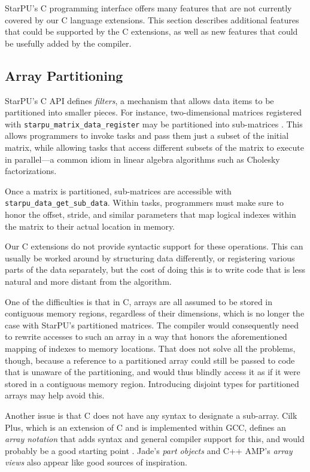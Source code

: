 \documentclass[twoside, a4paper, 10pt]{article}
\begin{document}
StarPU's C programming interface offers many features that are not
currently covered by our C language extensions.  This section describes
additional features that could be supported by the C extensions, as well
as new features that could be usefully added by the compiler.
\subsection{Array Partitioning}
\label{sec-5-1}


StarPU's C API defines \emph{filters}, a mechanism that allows data items to
be partitioned into smaller pieces.  For instance, two-dimensional
matrices registered with \texttt{starpu\_matrix\_data\_register} may be
partitioned into sub-matrices \cite{runtime12:starpu-handbook}.  This
allows programmers to invoke tasks and pass them just a subset of the
initial matrix, while allowing tasks that access different subsets of
the matrix to execute in parallel---a common idiom in linear algebra
algorithms such as Cholesky factorizations.

Once a matrix is partitioned, sub-matrices are accessible with
\texttt{starpu\_data\_get\_sub\_data}.  Within tasks, programmers must make sure to
honor the offset, stride, and similar parameters that map logical
indexes within the matrix to their actual location in memory.

Our C extensions do not provide syntactic support for these operations.
This can usually be worked around by structuring data differently, or
registering various parts of the data separately, but the cost of doing
this is to write code that is less natural and more distant from the
algorithm.

One of the difficulties is that in C, arrays are all assumed to be
stored in contiguous memory regions, regardless of their dimensions,
which is no longer the case with StarPU's partitioned matrices.  The
compiler would consequently need to rewrite accesses to such an array in
a way that honors the aforementioned mapping of indexes to memory
locations.  That does not solve all the problems, though, because a
reference to a partitioned array could still be passed to code that is
unaware of the partitioning, and would thus blindly access it as if it
were stored in a contiguous memory region.  Introducing disjoint types for
partitioned arrays may help avoid this.

Another issue is that C does not have any syntax to designate a
sub-array.  Cilk Plus, which is an extension of C and is implemented
within GCC, defines an \emph{array notation} that adds syntax and general
compiler support for this, and would probably be a good starting point
\cite{intel11:cilkplus}.  Jade's \emph{part objects}
\cite{Rinard:1998:DIE:291889.291893} and C++ AMP's \emph{array views}
\cite{amp1.0:2012} also appear like good sources of inspiration.
\end{document}
